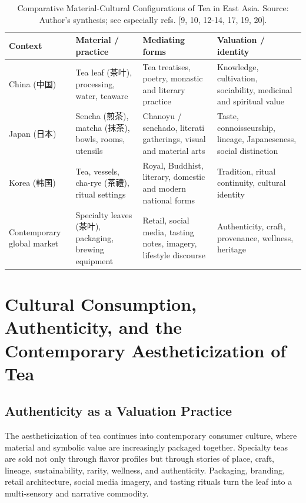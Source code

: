 \documentclass[numbers]{IntechOpen-Book}
\newcommand{\zh}[1]{{\CJKfontspec{Noto Serif CJK SC}\upshape #1}}
\begin{document}
\begin{table}[t]
\centering
\small
\renewcommand{\arraystretch}{1.12}
\begin{tabularx}{\textwidth}{>{\raggedright\arraybackslash}p{19mm} >{\raggedright\arraybackslash}X >{\raggedright\arraybackslash}X >{\raggedright\arraybackslash}X}
\toprule
\textbf{Context} & \textbf{Material / practice} & \textbf{Mediating forms} & \textbf{Valuation / identity}\\
\midrule
China (\zh{中国}) & Tea leaf (\zh{茶叶}), processing, water, teaware & Tea treatises, poetry, monastic and literary practice & Knowledge, cultivation, sociability, medicinal and spiritual value\\
Japan (\zh{日本}) & Sencha (\zh{煎茶}), matcha (\zh{抹茶}), bowls, rooms, utensils & Chanoyu / senchado, literati gatherings, visual and material arts & Taste, connoisseurship, lineage, Japaneseness, social distinction\\
Korea (\zh{韩国}) & Tea, vessels, cha-rye (\zh{茶禮}), ritual settings & Royal, Buddhist, literary, domestic and modern national forms & Tradition, ritual continuity, cultural identity\\
Contemporary global market & Specialty leaves (\zh{茶叶}), packaging, brewing equipment & Retail, social media, tasting notes, imagery, lifestyle discourse & Authenticity, craft, provenance, wellness, heritage\\
\bottomrule
\end{tabularx}
\caption{Comparative Material-Cultural Configurations of Tea in East Asia. Source: Author's synthesis; see especially refs. [9, 10, 12-14, 17, 19, 20].}
\end{table}

\section{Cultural Consumption, Authenticity, and the Contemporary Aestheticization of Tea}

\subsection{Authenticity as a Valuation Practice}

The aestheticization of tea continues into contemporary consumer culture, where material and symbolic value are increasingly packaged together. Specialty teas are sold not only through flavor profiles but through stories of place, craft, lineage, sustainability, rarity, wellness, and authenticity. Packaging, branding, retail architecture, social media imagery, and tasting rituals turn the leaf into a multi-sensory and narrative commodity.
\end{document}
